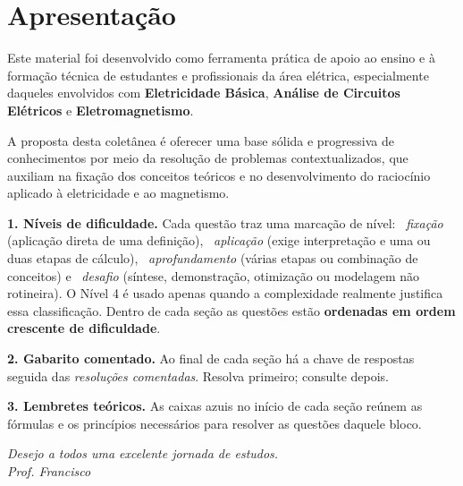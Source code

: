 \section*{Apresentação}
\thispagestyle{fancy}

Este material foi desenvolvido como ferramenta prática de apoio ao ensino e à
formação técnica de estudantes e profissionais da área elétrica, especialmente
daqueles envolvidos com \textbf{Eletricidade Básica}, \textbf{Análise de
Circuitos Elétricos} e \textbf{Eletromagnetismo}.

A proposta desta coletânea é oferecer uma base sólida e progressiva de
conhecimentos por meio da resolução de problemas contextualizados, que auxiliam
na fixação dos conceitos teóricos e no desenvolvimento do raciocínio aplicado à
eletricidade e ao magnetismo.

\begin{conceito}
\textbf{1. Níveis de dificuldade.} Cada questão traz uma marcação de nível:
~\emph{fixação} (aplicação direta de uma definição),
~\emph{aplicação} (exige interpretação e uma ou duas etapas de
cálculo), ~\emph{aprofundamento} (várias etapas ou combinação de
conceitos) e ~\emph{desafio} (síntese, demonstração, otimização ou
modelagem não rotineira). O Nível 4 é usado apenas quando a complexidade realmente
justifica essa classificação. Dentro de cada seção as questões estão
\textbf{ordenadas em ordem crescente de dificuldade}.

\smallskip
\textbf{2. Gabarito comentado.} Ao final de cada seção há a chave de respostas
seguida das \emph{resoluções comentadas}. Resolva primeiro; consulte depois.

\smallskip
\textbf{3. Lembretes teóricos.} As caixas azuis no início de cada seção reúnem as
fórmulas e os princípios necessários para resolver as questões daquele bloco.
\end{conceito}

\vspace{1em}
\begin{flushright}
\textit{Desejo a todos uma excelente jornada de estudos.}\\[2mm]
\textit{Prof. Francisco}
\end{flushright}
